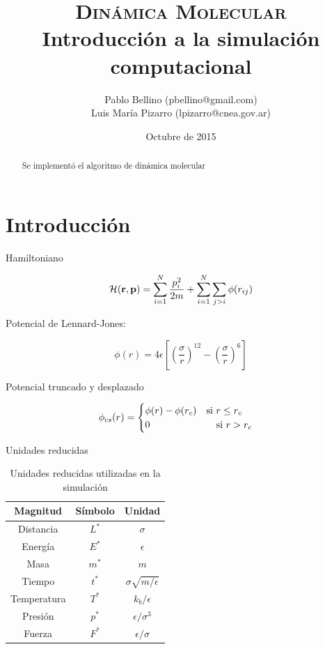 \documentclass[a4paper,12pt]{article}
\title{\textsc{Dinámica Molecular} \\ \vspace{2em} \Large{Introducción a la 
simulación computacional}}
\author{\small{ Pablo Bellino (pbellino@gmail.com)} \\
        \small{Luis María Pizarro (lpizarro@cnea.gov.ar)}}
\date{Octubre de 2015}
\begin{document}

\maketitle

\begin{abstract}
Se implementó el algoritmo de dinámica molecular 
\end{abstract}


\section{Introducción}

Hamiltoniano

\begin{equation}\label{eq:hamiltoniano}
  \mathcal H({\bf r},{\bf p}) = \sum_{i=1}^{N} \frac{p_i^2}{2m} + \sum_{i=1}^N \sum_{j>i} \phi (r_{ij})
\end{equation}

Potencial de Lennard-Jones:

\begin{equation}\label{eq:pot_LJ}
  \phi (r) = 4\epsilon\left[\left(\frac{\sigma}{r}\right)^{12} -\left(\frac{\sigma}{r}\right)^{6}\right]
\end{equation}

Potencial truncado y desplazado

\begin{equation}\label{eq:pot_cs}
  \phi_{cs}(r) = 
  \begin{cases}
	  \phi(r)- \phi(r_c) \quad \text{si } r \leq r_c \\
	  0 \hspace{2.4cm} \text{si } r > r_c
  \end{cases}
\end{equation}

Unidades reducidas

\begin{table}
	\label{tb:unidades}
	\begin{center}
\begin{tabular}{ccc}
	\hline
	{\bf Magnitud} & {\bf Símbolo} & {\bf Unidad} \\ \hline
	 Distancia & $L^*$& $\sigma$ \\ 
	Energía &$E^*$& $\epsilon$ \\ 
	Masa &$m^*$& $m$ \\ 
	Tiempo &$t^*$& $\sigma\sqrt{m/\epsilon}$ \\ 
	Temperatura &$T^*$& $k_b/\epsilon$ \\ 
	Presión &$p^*$& $\epsilon/\sigma^3$ \\ 
	Fuerza &$F^*$& $\epsilon/\sigma$ \\ 
	\hline 
\end{tabular}
\end{center} 
\caption{Unidades reducidas utilizadas en la simulación}
\end{table}
\end{document}

